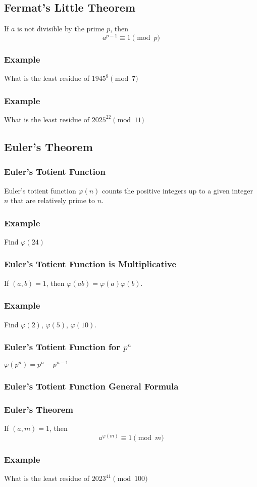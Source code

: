 \documentclass{article}
\begin{document}
\subsection{Fermat's Little Theorem}
If $a$ is not divisible by the prime $p$, then 
$$a^{p-1} \equiv 1 \pmod{p}$$

\subsubsection{Example}
What is the least residue of $1945^8 \pmod{7}$
\vspace{30px}
\subsubsection{Example}
What is the least residue of $2025^22 \pmod{11}$
\vspace{30px}


\subsection{Euler's Theorem}
\subsubsection{Euler's Totient Function}
Euler's totient function $ \varphi(n)$ counts the positive integers up to a given integer $n$ that are relatively prime to $n$.

\subsubsection{Example}
Find $ \varphi(24)$
\vspace{30px}
\subsubsection{Euler's Totient Function is Multiplicative}
If $(a,b)=1$, then $\varphi(ab)=\varphi(a)\varphi(b)$.

\subsubsection{Example}
Find $ \varphi(2)$, $ \varphi(5)$, $ \varphi(10)$.
\vspace{40px}
\subsubsection{Euler's Totient Function for $p^n$}
$ \varphi(p^n)=p^n-p^{n-1}$
\vspace{30px}
\subsubsection{Euler's Totient Function General Formula}
\vspace{50px}
\subsubsection{Euler's Theorem}
If $(a,m)=1$, then 
$$a^{\varphi(m)} \equiv 1 \pmod{m}$$
\subsubsection{Example}
What is the least residue of $2023^{41} \pmod{100}$
\end{document}
